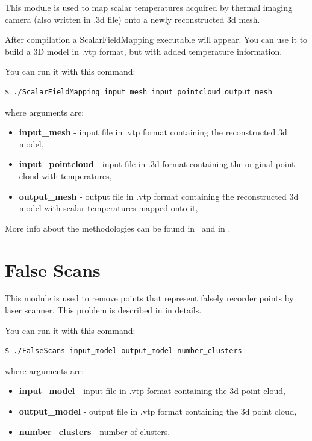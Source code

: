 \documentclass[11pt]{article} %
\begin{document}
This module is used to map scalar temperatures acquired by thermal imaging camera (also written in .3d file) onto a newly reconstructed 3d mesh. 

After compilation a ScalarFieldMapping executable will appear. You can use it to build a 3D model in .vtp format, but with added temperature information.

You can run it with this command:

\begin{verbatim}
$ ./ScalarFieldMapping input_mesh input_pointcloud output_mesh
\end{verbatim}

where arguments are:
\begin{itemize}

\item \textbf{input\_mesh} - input file in .vtp format containing the reconstructed 3d model,
\item \textbf{input\_pointcloud} - input file in .3d format containing the original point cloud with temperatures,
\item \textbf{output\_mesh} - output file in .vtp format containing the reconstructed 3d model with scalar temperatures mapped onto it,
\end{itemize}

More info about the methodologies can be found in~\citep{osmankovicreconstructing} and in \citep{borrmannproject}.


\section{False Scans}

This module is used to remove points that represent falsely recorder points by laser scanner. This problem is described in \citep{osmankovic2012increasing} in details.

You can run it with this command:

\begin{verbatim}
$ ./FalseScans input_model output_model number_clusters
\end{verbatim}

where arguments are:
\begin{itemize}

\item \textbf{input\_model} - input file in .vtp format containing the 3d point cloud,
\item \textbf{output\_model} - output file in .vtp format containing the 3d point cloud,
\item \textbf{number\_clusters} - number of clusters.
\end{itemize}
\end{document}
